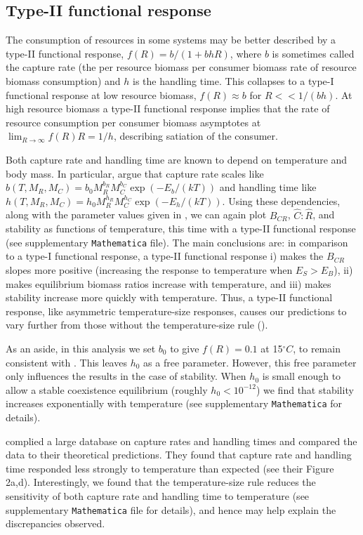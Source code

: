 \documentclass[11pt]{article}
\begin{document}
\subsection*{Type-II functional response}

The consumption of resources in some systems may be better described by a type-II functional response, $f(R) = b / (1 + b h R)$, where $b$ is sometimes called the capture rate (the per resource biomass per consumer biomass rate of resource biomass consumption) and $h$ is the handling time.
This collapses to a type-I functional response at low resource biomass, $f(R) \approx b$ for $R << 1/(b h)$.
At high resource biomass a type-II functional response implies that the rate of resource consumption per consumer biomass asymptotes at $\lim_{R\rightarrow\infty}f(R) R = 1/h$, describing satiation of the consumer.

Both capture rate and handling time are known to depend on temperature and body mass.
In particular, \cite{Rall2012} argue that capture rate scales like $b(T, M_R, M_C) = b_0 M_R^{b_R} M_C^{b_C} \exp(-E_b/(k T))$ and handling time like $h(T, M_R, M_C) = h_0 M_R^{h_R} M_C^{h_C} \exp(-E_h/(k T))$.
Using these dependencies, along with the parameter values given in \cite{Rall2012}, we can again plot $B_{CR}$, $\hat{C}:\hat{R}$, and stability as functions of temperature, this time with a type-II functional response (see supplementary \texttt{Mathematica} file).
The main conclusions are: in comparison to a type-I functional response, a type-II functional response i) makes the $B_{CR}$ slopes more positive (increasing the response to temperature when $E_S > E_B$), ii) makes equilibrium biomass ratios increase with temperature, and iii) makes stability increase more quickly with temperature.
Thus, a type-II functional response, like asymmetric temperature-size responses, causes our predictions to vary further from those without the temperature-size rule (\cite{Gilbert2014}).

As an aside, in this analysis we set $b_0$ to give $f(R) = 0.1$ at 15$^\circ C$, to remain consistent with \cite{Gilbert2014}.
This leaves $h_0$ as a free parameter. 
However, this free parameter only influences the results in the case of stability.
When $h_0$ is small enough to allow a stable coexistence equilibrium (roughly $h_0 <10^{-12}$) we find that stability increases exponentially with temperature (see supplementary \texttt{Mathematica} for details).

\cite{Rall2012} complied a large database on capture rates and handling times and compared the data to their theoretical predictions.
They found that capture rate and handling time responded less strongly to temperature than expected (see their Figure 2a,d).
Interestingly, we found that the temperature-size rule reduces the sensitivity of both capture rate and handling time to temperature (see supplementary \texttt{Mathematica} file for details), and hence may help explain the discrepancies observed. 
\end{document}
